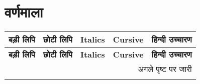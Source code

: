 \section{वर्णमाला} \label{sec: intro-alpha-list}
\begin{tabularx}{\linewidth}{| c | c | c | c | X |}
    \caption{वर्णमाला}\label{tab: alphabet}  \tabularnewline
    \toprule

    \midrule
    \textbf{बड़ी लिपि} & \textbf{छोटी लिपि} & \textbf{Italics} & \textbf{Cursive}  & \textbf{हिन्दी उच्चारण} \tabularnewline
    \midrule
    \endfirsthead

    \midrule
    \textbf{बड़ी लिपि} & \textbf{छोटी लिपि} & \textbf{Italics} & \textbf{Cursive}  & \textbf{हिन्दी उच्चारण} \tabularnewline
    \midrule
    \endhead

    \multicolumn{5}{r}{\footnotesize{अगले पृष्ट पर जारी}} \tabularnewline
    \endfoot


\end{tabularx}
